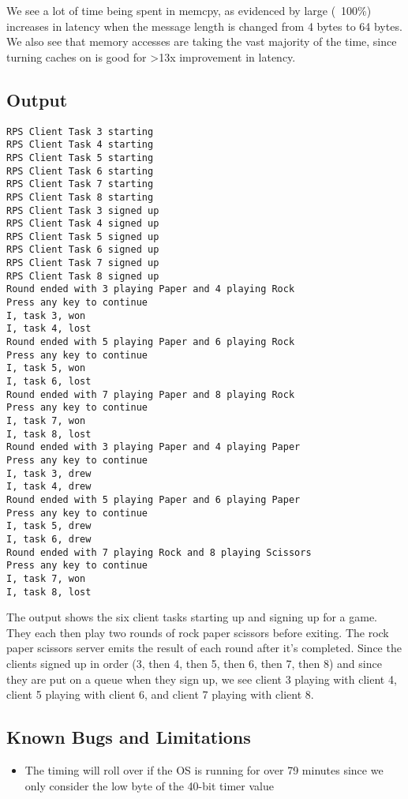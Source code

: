 \documentclass{article}
\begin{document}
We see a lot of time being spent in memcpy, as evidenced by large (~100\%) increases in latency when the message length is changed from 4 bytes to 64 bytes. We also see that memory accesses are taking the vast majority of the time, since turning caches on is good for >13x improvement in latency.

\subsection{Output}
\begin{verbatim}
RPS Client Task 3 starting
RPS Client Task 4 starting
RPS Client Task 5 starting
RPS Client Task 6 starting
RPS Client Task 7 starting
RPS Client Task 8 starting
RPS Client Task 3 signed up
RPS Client Task 4 signed up
RPS Client Task 5 signed up
RPS Client Task 6 signed up
RPS Client Task 7 signed up
RPS Client Task 8 signed up
Round ended with 3 playing Paper and 4 playing Rock
Press any key to continue 
I, task 3, won
I, task 4, lost
Round ended with 5 playing Paper and 6 playing Rock
Press any key to continue 
I, task 5, won
I, task 6, lost
Round ended with 7 playing Paper and 8 playing Rock
Press any key to continue 
I, task 7, won
I, task 8, lost
Round ended with 3 playing Paper and 4 playing Paper
Press any key to continue 
I, task 3, drew
I, task 4, drew
Round ended with 5 playing Paper and 6 playing Paper
Press any key to continue 
I, task 5, drew
I, task 6, drew
Round ended with 7 playing Rock and 8 playing Scissors
Press any key to continue 
I, task 7, won
I, task 8, lost
\end{verbatim}

The output shows the six client tasks starting up and signing up for a game. They each then play two rounds of rock paper scissors before exiting. The rock paper scissors server emits the result of each round after it's completed. Since the clients signed up in order (3, then 4, then 5, then 6, then 7, then 8) and since they are put on a queue when they sign up, we see client 3 playing with client 4, client 5 playing with client 6, and client 7 playing with client 8.

\subsection{Known Bugs and Limitations}
\begin{itemize}
    \item The timing will roll over if the OS is running for over 79 minutes since we only consider the low byte of the 40-bit timer value
\end{itemize}
\end{document}

